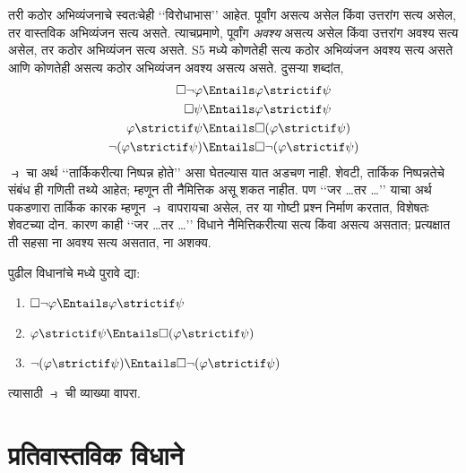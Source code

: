 तरी कठोर अभिव्यंजनाचे स्वतःचेही
‘‘विरोधाभास’’ आहेत. पूर्वांग असत्य
असेल किंवा उत्तरांग सत्य असेल,
तर वास्तविक अभिव्यंजन सत्य
असते. त्याचप्रमाणे, पूर्वांग
\emph{अवश्य} असत्य असेल
किंवा उत्तरांग अवश्य सत्य असेल,
तर कठोर अभिव्यंजन सत्य असते.
S5 मध्ये कोणतेही सत्य कठोर
अभिव्यंजन अवश्य सत्य असते
आणि कोणतेही असत्य कठोर
अभिव्यंजन अवश्य असत्य असते.
दुसऱ्या शब्दांत,
\begin{align}
  \Box \lnot \varphi & \Entails \varphi \strictif \psi\\
  \Box \psi & \Entails \varphi \strictif \psi\\
  \varphi \strictif \psi& \Entails \Box(\varphi \strictif \psi)\\
  \lnot(\varphi \strictif \psi) & \Entails \Box\lnot(\varphi \strictif \psi)
\end{align}
$\strictif$ चा अर्थ ‘‘तार्किकरीत्या
निष्पन्न होते’’ असा घेतल्यास
यात अडचण नाही. शेवटी,
तार्किक निष्पन्नतेचे संबंध ही
गणिती तथ्ये आहेत; म्हणून
ती नैमित्तिक असू शकत नाहीत.
पण ‘‘जर \dots तर \dots’’
याचा अर्थ पकडणारा तार्किक
कारक म्हणून $\strictif$
वापरायचा असेल, तर या
गोष्टी प्रश्न निर्माण करतात,
विशेषतः शेवटच्या दोन.
कारण काही ‘‘जर \dots तर \dots’’
विधाने नैमित्तिकरीत्या
सत्य किंवा असत्य असतात;
प्रत्यक्षात ती सहसा
ना अवश्य सत्य असतात,
ना अशक्य.

\begin{prob}
  पुढील विधानांचे 
  मध्ये पुरावे द्या:
  \begin{enumerate}
    \item  $\Box \lnot \varphi \Entails \varphi \strictif \psi$
    \item $\varphi \strictif \psi \Entails \Box(\varphi \strictif \psi)$
    \item $\lnot(\varphi \strictif \psi)  \Entails \Box\lnot(\varphi \strictif \psi)$
  \end{enumerate}
  त्यासाठी $\strictif$ ची
  व्याख्या वापरा.
\end{prob}












\section{प्रतिवास्तविक विधाने}\label{cnt:int:cnt:sec}

